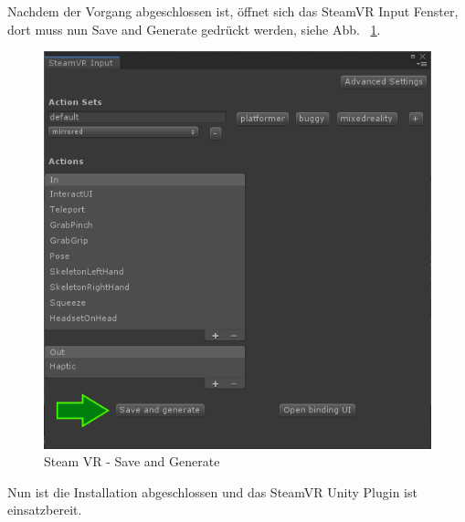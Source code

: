 Nachdem der Vorgang abgeschlossen ist, öffnet sich das SteamVR Input Fenster, dort muss nun Save and Generate gedrückt werden, siehe Abb. ~\ref{fig:steamvr_save_and_generate}.
\begin {figure}
    \centering
    \includegraphics[scale=0.6]{pics/steamVR-Input-SaveAndGenerate}
    \caption{Steam VR - Save and Generate}
    \label{fig:steamvr_save_and_generate}
\end {figure}
Nun ist die Installation abgeschlossen und das SteamVR Unity Plugin ist einsatzbereit.
~\cite{SteamVR_Quickstart_2022}

